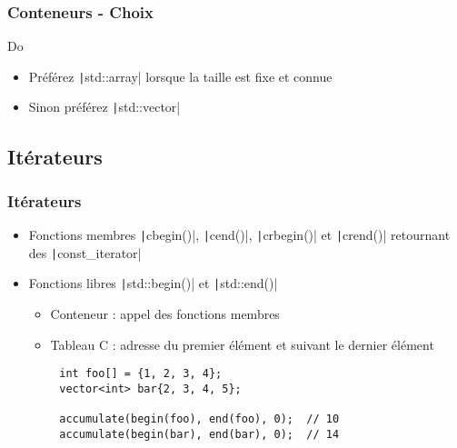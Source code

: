 \documentclass[C++.tex]{subfiles}
\begin{document}
\begin{frame}[fragile]
	\frametitle{Conteneurs - Choix}
	\begin{exampleblock}{Do}
		\begin{itemize}
			\item Préférez \texttt|std::array| lorsque la taille est fixe et connue
			\item Sinon préférez \texttt|std::vector| 
		\end{itemize}
	\end{exampleblock}
\end{frame}

\subsection*{Itérateurs}
\begin{frame}[fragile]
	\frametitle{Itérateurs}
	\begin{itemize}
		\item Fonctions membres \texttt|cbegin()|, \texttt|cend()|, \texttt|crbegin()| et \texttt|crend()| retournant des \texttt|const_iterator|


		\item Fonctions libres \texttt|std::begin()| et \texttt|std::end()|
		\begin{itemize}
			\item Conteneur : appel des fonctions membres
			\item Tableau C : adresse du premier élément et suivant le dernier élément
		\end{itemize}
	\end{itemize}

	\begin{verbatim}
		int foo[] = {1, 2, 3, 4};
		vector<int> bar{2, 3, 4, 5};

		accumulate(begin(foo), end(foo), 0);  // 10
		accumulate(begin(bar), end(bar), 0);  // 14
	\end{verbatim}


\end{frame}
\end{document}
